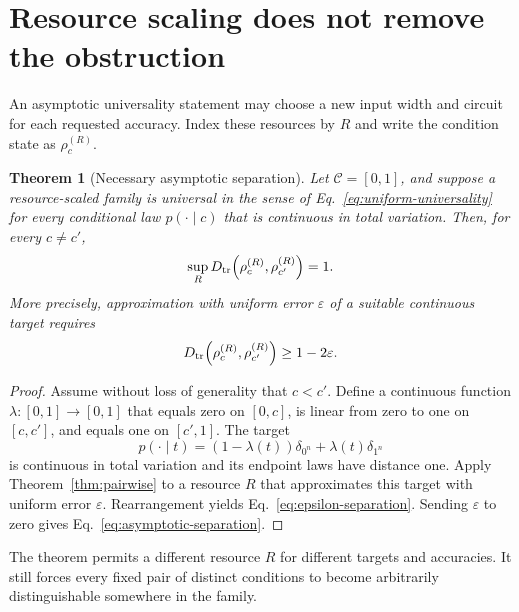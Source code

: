 \documentclass[11pt]{article}
\newtheorem{theorem}{Theorem}[section]
\theoremstyle{definition}
\theoremstyle{remark}
\newcommand{\cC}{\mathcal{C}}
\begin{document}
\section{Resource scaling does not remove the obstruction}
\label{sec:resource}

An asymptotic universality statement may choose a new input width and circuit
for each requested accuracy.  Index these resources by $R$ and write the
condition state as $\rho_c^{(R)}$.

\begin{theorem}[Necessary asymptotic separation]
\label{thm:asymptotic-separation}
Let $\cC=[0,1]$, and suppose a resource-scaled family is universal in the
sense of Eq.~\eqref{eq:uniform-universality} for every conditional law
$p(\cdot\mid c)$ that is continuous in total variation.  Then, for every
$c\neq c'$,
\begin{equation}
  \sup_R D_{\rm tr}\!\left(\rho_c^{(R)},\rho_{c'}^{(R)}\right)=1.
  \label{eq:asymptotic-separation}
\end{equation}
More precisely, approximation with uniform error $\varepsilon$ of a suitable
continuous target requires
\begin{equation}
  D_{\rm tr}\!\left(\rho_c^{(R)},\rho_{c'}^{(R)}\right)
  \geq 1-2\varepsilon.
  \label{eq:epsilon-separation}
\end{equation}
\end{theorem}

\begin{proof}
Assume without loss of generality that $c<c'$.  Define a continuous function
$\lambda:[0,1]\to[0,1]$ that equals zero on $[0,c]$, is linear from zero to
one on $[c,c']$, and equals one on $[c',1]$.  The target
\begin{equation}
 p(\cdot\mid t)=(1-\lambda(t))\delta_{0^n}
                  +\lambda(t)\delta_{1^n}
 \label{eq:ramp-target}
\end{equation}
is continuous in total variation and its endpoint laws have distance one.
Apply Theorem~\ref{thm:pairwise} to a resource $R$ that approximates this
target with uniform error $\varepsilon$.  Rearrangement yields
Eq.~\eqref{eq:epsilon-separation}.  Sending $\varepsilon$ to zero gives
Eq.~\eqref{eq:asymptotic-separation}.
\end{proof}

The theorem permits a different resource $R$ for different targets and
accuracies.  It still forces every fixed pair of distinct conditions to become
arbitrarily distinguishable somewhere in the family.
\end{document}
